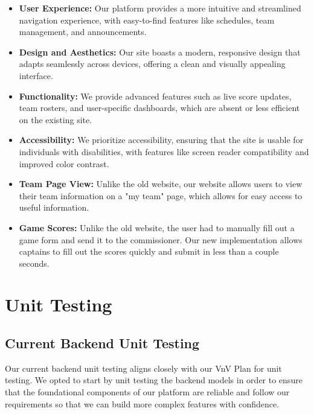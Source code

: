 \documentclass[12pt, titlepage]{article}
\begin{document}
    \begin{itemize}
        \item \textbf{User Experience:} Our platform provides a more intuitive and streamlined navigation experience, with easy-to-find features like schedules, team management, and announcements.
        \item \textbf{Design and Aesthetics:} Our site boasts a modern, responsive design that adapts seamlessly across devices, offering a clean and visually appealing interface.
        \item \textbf{Functionality:} We provide advanced features such as live score updates, team rosters, and user-specific dashboards, which are absent or less efficient on the existing site.
        \item \textbf{Accessibility:} We prioritize accessibility, ensuring that the site is usable for individuals with disabilities, with features like screen reader compatibility and improved color contrast.
         \item \textbf{Team Page View:} Unlike the old website, our website allows users to view their team information on a "my team" page, which allows for easy access to useful information.
         \item \textbf{Game Scores:} Unlike the old website, the user had to manually fill out a game form and send it to the commissioner. Our new implementation allows captains to fill out the scores quickly and submit in less than a couple seconds.
    \end{itemize}

\section{Unit Testing}

\subsection{Current Backend Unit Testing}

Our current backend unit testing aligns closely with our VnV Plan for unit testing. We opted to start by unit testing the backend models in order to ensure that the foundational components of our platform are reliable and follow our requirements so that we can build more complex features with confidence.
\end{document}
